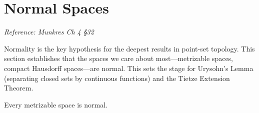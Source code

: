 \documentclass[11pt]{report}
\begin{document}
\section{Normal Spaces}

\textit{Reference: Munkres Ch 4 \S 32}

\begin{rembox}
Normality is the key hypothesis for the deepest results in point-set topology. This section establishes that the spaces we care about most---metrizable spaces, compact Hausdorff spaces---are normal. This sets the stage for Urysohn's Lemma (separating closed sets by continuous functions) and the Tietze Extension Theorem.
\end{rembox}

\begin{thmbox}
Every metrizable space is normal.
\end{thmbox}
\end{document}
